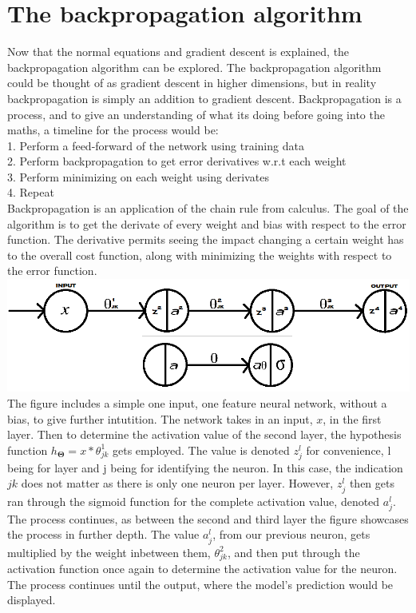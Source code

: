 \documentclass[a4paper,12pt]{article}
\begin{document}
\section{The backpropagation algorithm}
Now that the normal equations and gradient descent is explained, the backpropagation algorithm can be explored. The backpropagation algorithm could be thought of as gradient descent in higher dimensions, but in reality backpropagation is simply an addition to gradient descent. Backpropagation is a process, and to give an understanding of what its doing before going into the maths, a timeline for the process would be: 
\\ 1. Perform a feed-forward of the network using training data
\\ 2. Perform backpropagation to get error derivatives w.r.t each weight
\\ 3. Perform minimizing on each weight using derivates
\\ 4. Repeat
\\
Backpropagation is an application of the chain rule from calculus. The goal of the algorithm is to get the derivate of every weight and bias with respect to the error function. The derivative permits seeing the impact changing a certain weight has to the overall cost function, along with minimizing the weights with respect to the error function\cite{backpropagation}. 
\\
\includegraphics[scale=0.548]{onedimension}
\\
The figure includes a simple one input, one feature neural network, without a bias, to give further intutition. The network takes in an input, $x$, in the first layer. Then to determine the activation value of the second layer, the hypothesis function $h_{\boldsymbol{\Theta}} = x*\theta_{jk}^1$ gets employed. The value is denoted $z^l_j$ for convenience, l being for layer and j being for identifying the neuron. In this case, the indication $jk$ does not matter as there is only one neuron per layer. However, $z^l_j$ then gets ran through the sigmoid function for the complete activation value, denoted $a^l_j$. The process continues, as between the second and third layer the figure showcases the process in further depth. The value $a^l_j$, from our previous neuron, gets multiplied by the weight inbetween them, $\theta_{jk}^2$, and then put through the activation function once again to determine the activation value for the neuron. The process continues until the output, where the model's prediction would be displayed. 
\end{document}
